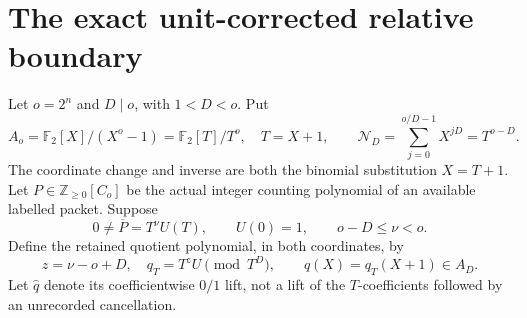 \section{The exact unit-corrected relative boundary}
Let $o=2^n$ and $D\mid o$, with $1<D<o$. Put
\[
 A_o=\mathbb F_2[X]/(X^o-1)=\mathbb F_2[T]/T^o,\quad T=X+1,
 \qquad \mathcal N_D=\sum_{j=0}^{o/D-1}X^{jD}=T^{o-D}.
                                                               \tag{B1}
\]
The coordinate change and inverse are both the binomial substitution $X=T+1$.
Let $P\in\mathbb Z_{\ge0}[C_o]$ be the actual integer counting polynomial of
an available labelled packet. Suppose
\[
 0\ne\overline P=T^\nu U(T),\qquad U(0)=1,
 \qquad o-D\le\nu<o.
\]
Define the retained quotient polynomial, in both coordinates, by
\[
 z=\nu-o+D,\quad q_T=T^zU\pmod{T^D},\qquad q(X)=q_T(X+1)\in A_D.
                                                               \tag{B2}
\]
Let $\widehat q$ denote its coefficientwise $0/1$ lift, not a lift of the
$T$-coefficients followed by an unrecorded cancellation.

